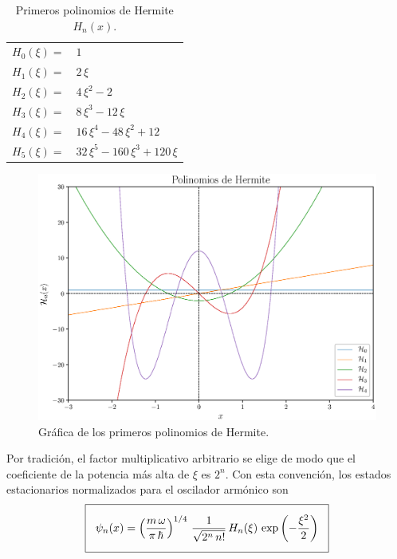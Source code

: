 \begin{center}
\begin{table}[H]
\large
\centering
\begin{tabular}{l l}
$H_{0}(\xi) =$ & $1$ \\
$H_{1}(\xi) =$ & $2 \, \xi$ \\
$H_{2}(\xi) =$ & $4 \, \xi^{2} - 2 $ \\
$H_{3}(\xi) =$ & $8 \, \xi^{3} - 12 \, \xi$ \\
$H_{4}(\xi) =$ & $16 \, \xi^{4} - 48 \, \xi^{2} + 12 $ \\
$H_{5}(\xi) =$ & $32 \, \xi^{5} - 160 \, \xi^{3} + 120 \, \xi$
\end{tabular}
\caption{Primeros polinomios de Hermite $H_{n}(x)$.}
\label{tabla_001}
\end{table}
\begin{figure}[H]
    \centering
    \includegraphics[scale=0.7]{Imagenes/Polinomios_Hermite_01.eps}
    \caption{Gráfica de los primeros polinomios de Hermite.}
    \label{figura_003}
\end{figure}
\end{center}
Por tradición, el factor multiplicativo arbitrario se elige de modo que el coeficiente de la potencia más alta de $\xi$ es $2^{n}$. Con esta convención, los estados estacionarios normalizados para el oscilador armónico son
\begin{align}
\setlength{\fboxsep}{3\fboxsep}\boxed{
\psi_{n} (x) = \left( \dfrac{m \, \omega}{\pi \, \hbar} \right)^{1/4} \, \dfrac{1}{\sqrt{2^{n} \, n!}} \, H_{n} (\xi) \, \exp \left( - \dfrac{\xi^{2}}{2} \right)}
\label{eq:ecuacion_02_069}
\end{align}
